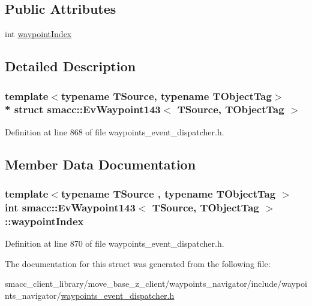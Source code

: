 \subsection*{Public Attributes}
\begin{DoxyCompactItemize}
\item 
int \hyperlink{structsmacc_1_1EvWaypoint143_a8abe74ca83b7f74ae241f376de3b0fb9}{waypoint\+Index}
\end{DoxyCompactItemize}


\subsection{Detailed Description}
\subsubsection*{template$<$typename T\+Source, typename T\+Object\+Tag$>$\\*
struct smacc\+::\+Ev\+Waypoint143$<$ T\+Source, T\+Object\+Tag $>$}



Definition at line 868 of file waypoints\+\_\+event\+\_\+dispatcher.\+h.



\subsection{Member Data Documentation}
\subsubsection[{\texorpdfstring{waypoint\+Index}{waypointIndex}}]{\setlength{\rightskip}{0pt plus 5cm}template$<$typename T\+Source , typename T\+Object\+Tag $>$ int {\bf smacc\+::\+Ev\+Waypoint143}$<$ T\+Source, T\+Object\+Tag $>$\+::waypoint\+Index}\hypertarget{structsmacc_1_1EvWaypoint143_a8abe74ca83b7f74ae241f376de3b0fb9}{}\label{structsmacc_1_1EvWaypoint143_a8abe74ca83b7f74ae241f376de3b0fb9}


Definition at line 870 of file waypoints\+\_\+event\+\_\+dispatcher.\+h.



The documentation for this struct was generated from the following file\+:\begin{DoxyCompactItemize}
\item 
smacc\+\_\+client\+\_\+library/move\+\_\+base\+\_\+z\+\_\+client/waypoints\+\_\+navigator/include/waypoints\+\_\+navigator/\hyperlink{waypoints__event__dispatcher_8h}{waypoints\+\_\+event\+\_\+dispatcher.\+h}\end{DoxyCompactItemize}
